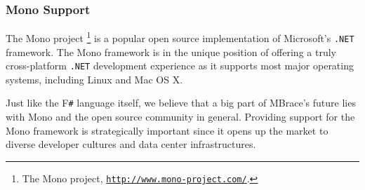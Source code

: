 \documentclass[9pt,a4paper]{article}
\newcommand{\mbrace}{MBrace}
\newcommand{\fsharp}{F\texttt \#}
\newcommand{\dotnet}{\texttt{\hbox{.}NET}}
\newcommand{\samehref}[1]{\href{#1}{\texttt{#1}}}
\begin{document}
\subsubsection*{Mono Support}

The Mono project%
\footnote{The Mono project, \samehref{http://www.mono-project.com/}.}
is a popular open source implementation of Microsoft's \dotnet{} framework.
The Mono framework is in the unique position of offering a truly cross-platform
\dotnet{} development experience as it supports most major operating systems,
including Linux and Mac OS X.

Just like the \fsharp{} language itself, we believe that a big part of \mbrace{}'s 
future lies with Mono and the open source community in general. Providing support
for the Mono framework is strategically important since it opens up the market
to diverse developer cultures and data center infrastructures.




%
%
%

%
%
\end{document}
